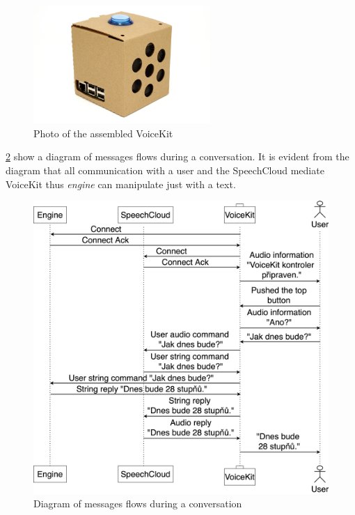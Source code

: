 \begin{figure}[H]
	\centering
	\includegraphics[width=0.6\textwidth]{img/voicekit_photo.png}
	\caption{Photo of the assembled VoiceKit \citep{wiki:voicekit_photo}}
	\label{fig:voicekit_photo}
\end{figure}


\cref{fig:message_flow} show a diagram of messages flows during a conversation. It is evident from the diagram that all communication with a user and the SpeechCloud mediate VoiceKit thus \textit{engine} can manipulate just with a text.

\begin{figure}[H]
	\centering
	\includegraphics[width=\textwidth]{img/message_flow.png}
	\caption{Diagram of messages flows during a conversation}
	\label{fig:message_flow}
\end{figure}

